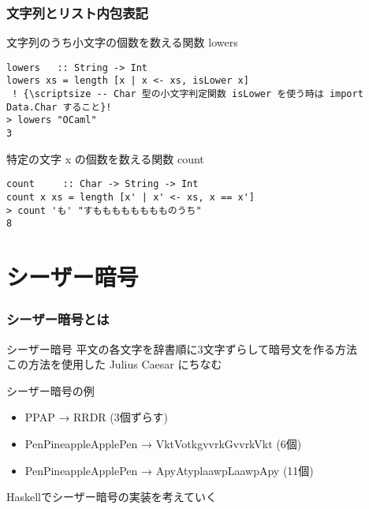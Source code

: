 \documentclass[dvipdfmx,cjk,xcolor=dvipsnames,envcountsect,notheorems,12pt]{beamer}
\theoremstyle{definition}
\begin{document}
\begin{frame}[fragile]
\frametitle{文字列とリスト内包表記}
\begin{exampleblock}{文字列のうち小文字の個数を数える関数 lowers}
\begin{lstlisting}[frame=none, escapechar=!]
lowers   :: String -> Int
lowers xs = length [x | x <- xs, isLower x] 
 ! {\scriptsize -- Char 型の小文字判定関数 isLower を使う時は import Data.Char すること}!
> lowers "OCaml"
3
\end{lstlisting}
\end{exampleblock}
\begin{exampleblock}{特定の文字 x の個数を数える関数 count}
\begin{lstlisting}[frame=none, escapechar=!]
count     :: Char -> String -> Int
count x xs = length [x' | x' <- xs, x == x']
> count 'も' "すもももももももものうち"
8
\end{lstlisting}
\end{exampleblock}
\end{frame}

\section{シーザー暗号}

\begin{frame}[fragile]
\frametitle{シーザー暗号とは}
\begin{block}{シーザー暗号}
平文の各文字を辞書順に3文字ずらして暗号文を作る方法
\\ この方法を使用した Julius Caesar にちなむ
\end{block}
\vfill
\begin{exampleblock}{シーザー暗号の例}
\begin{itemize}
\item PPAP → RRDR (3個ずらす)
\item PenPineappleApplePen → VktVotkgvvrkGvvrkVkt (6個)
\item PenPineappleApplePen → ApyAtyplaawpLaawpApy (11個)
\end{itemize}
\end{exampleblock}
\vfill
Haskellでシーザー暗号の実装を考えていく
\end{frame}
\end{document}
